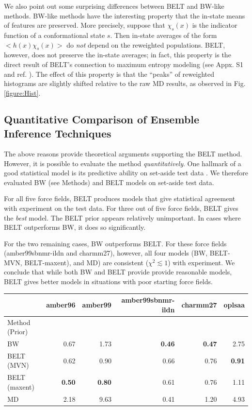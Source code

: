 \documentclass[journal=jacsat,manuscript=article]{achemso}
\begin{document}
We also point out some surprising differences between BELT and BW-like methods.  BW-like methods have the interesting property that the in-state means of features are preserved.  More precisely, suppose that $\chi_s(x)$ is the indicator function of a conformational state $s$.  Then in-state averages of the form $<h(x) \chi_s(x)>$ do \emph{not} depend on the reweighted populations.  BELT, however, does not preserve the in-state averages; in fact, this property is the direct result of BELT's connection to maximum entropy modeling (see Appx. S1 and ref. \cite{chodera2012}).  The effect of this property is that the ``peaks'' of reweighted histograms are slightly shifted relative to the raw MD results, as observed in Fig. \ref{figure:Hist}.  

\subsection{Quantitative Comparison of Ensemble Inference Techniques}

The above reasons provide theoretical arguments supporting the BELT method.  However, it is possible to evaluate the method \emph{quantitatively}.  One hallmark of a good statistical model is its predictive ability on set-aside test data \cite{friedman2001elements}.  We therefore evaluated BW (see Methods) and BELT models on set-aside test data.  

For all five force fields, BELT produces models that give statistical agreement with experiment on the test data.  For three out of five force fields, BELT gives the \emph{best} model.  The BELT prior appears relatively unimportant.  In cases where BELT outperforms BW, it does so significantly.  

For the two remaining cases, BW outperforms BELT.  For these force fields (amber99sbnmr-ildn and charmm27), however, all four models (BW, BELT-MVN, BELT-maxent), and MD) are consistent ($\chi^2 \lesssim 1$) with experiment.  We conclude that while both BW and BELT provide provide reasonable models, BELT gives better models in situations with poor starting force fields.  

\begin{tabular}{lrrrrr}
\toprule
   &               amber96 &  amber99 &  amber99sbnmr-ildn &  charmm27 &  oplsaa \\
\midrule
Method (Prior)&          &          &                    &           &         \\
BW            &     0.67 &     1.73 &           \bf{0.46}&  \bf{0.47}&    2.75 \\
BELT  (MVN)   &     0.62 &     0.90 &               0.66 &      0.76 &\bf{0.91} \\
BELT  (maxent)&\bf{0.50} &\bf{0.80} &               0.61 &      0.76 &    1.11 \\
MD            &     2.18 &     9.63 &               0.41 &      1.20 &    4.93 \\
\bottomrule
\end{tabular}
\end{document}
